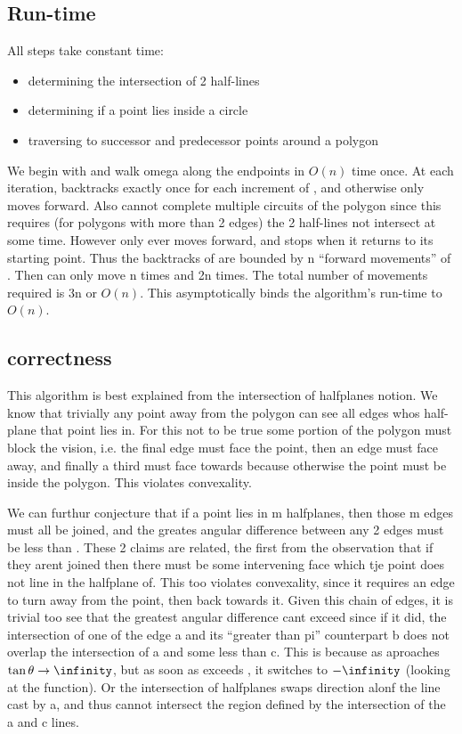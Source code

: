 \subsection{Run-time}
All steps take constant time:
\begin{itemize}
	\item determining the intersection of 2 half-lines
	\item determining if a point lies inside a circle
	\item traversing to successor and predecessor points around a polygon
\end{itemize}
We begin with \alpha and walk omega along the endpoints in $O(n)$ time once.
At each iteration, \omega backtracks exactly once for each increment of \alpha, and otherwise only moves forward.
Also \omega cannot complete multiple circuits of the polygon since this requires (for polygons with more than 2 edges) the 2 half-lines not intersect at some time.
However \alpha only ever moves forward, and stops when it returns to its starting point.
Thus the backtracks of \omega are bounded by n ``forward movements'' of \alpha.
Then \alpha can only move n times and \omega 2n times.
The total number of movements required is 3n or $O(n)$.
This asymptotically binds the algorithm's run-time to $O(n)$.

\subsection{correctness}
This algorithm is best explained from the intersection of halfplanes notion.
We know that trivially any point away from the polygon can see all edges whos half-plane that point lies in.
For this not to be true some portion of the polygon must block the vision, i.e. the final edge must face the point, then an edge must face away, and finally a third must face towards because otherwise the point must be inside the polygon.
This violates convexality.

We can furthur conjecture that if a point lies in m halfplanes, then those m edges must all be joined, and the greates angular difference between any 2 edges must be less than \pi.
These 2 claims are related, the first from the observation that if they arent joined then there must be some intervening face which tje point does not line in the halfplane of.
This too violates convexality, since it requires an edge to turn away from the point, then back towards it.
Given this chain of edges, it is trivial too see that the greatest angular difference cant exceed \pi since if it did, the intersection of one of the edge a and its ``greater than pi'' counterpart b does not overlap the intersection of a and some less than \pi c.
This is because as \theta aproaches \pi $\tan \theta \rightarrow \infinity$, but as soon as \theta exceeds \pi, it switches to $-\infinity$ (looking at the \tan function).
Or the intersection of halfplanes swaps direction alonf the line cast by a, and thus cannot intersect the region defined by the intersection of the a and c lines.

